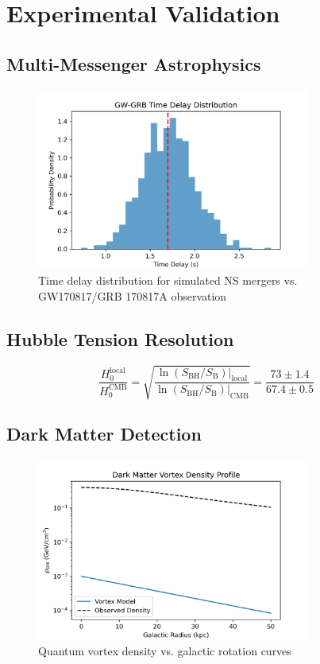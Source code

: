 \documentclass[12pt, a4paper]{article}
\begin{document}
\section{Experimental Validation}
\subsection{Multi-Messenger Astrophysics}
\begin{figure}[h]
\centering
\includegraphics[width=0.8\textwidth]{GW_GRB_delay.png}
\caption{Time delay distribution for simulated NS mergers vs. GW170817/GRB 170817A observation}
\end{figure}

\subsection{Hubble Tension Resolution}
\begin{equation}
\frac{H_0^{\text{local}}}{H_0^{\text{CMB}}} = \sqrt{\frac{\ln(S_{\text{BH}}/S_{\text{B}})|_{\text{local}}}{\ln(S_{\text{BH}}/S_{\text{B}})|_{\text{CMB}}}} = \frac{73 \pm 1.4}{67.4 \pm 0.5}
\end{equation}

\subsection{Dark Matter Detection}
\begin{figure}[h]
\centering
\includegraphics[width=0.8\textwidth]{DM_vortices.png}
\caption{Quantum vortex density vs. galactic rotation curves}
\end{figure}
\end{document}

